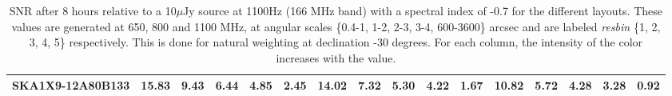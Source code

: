 \begin{table}[htp]
{{\begin{tabular}{|lccccc||ccccc||ccccc|}
SKA1X9-12A80B133 & 15.83 \cellcolor{blue!60.00} & 9.43 \cellcolor{red!22.08} & 6.44 \cellcolor{green!40.31} & 4.85 \cellcolor{orange!18.00} & 2.45 \cellcolor{purple!21.23} & 14.02 \cellcolor{blue!60.00} & 7.32 \cellcolor{red!18.00} & 5.30 \cellcolor{green!24.86} & 4.22 \cellcolor{orange!18.00} & 1.67 \cellcolor{purple!22.20} & 10.82 \cellcolor{blue!54.28} & 5.72 \cellcolor{red!20.05} & 4.28 \cellcolor{green!33.08} & 3.28 \cellcolor{orange!18.00} & 0.92 \cellcolor{purple!18.00}\\ \hline 
\end{tabular}}
\vspace{-0.300000cm}
\hfill
\caption{SNR after 8 hours relative to a 10$\mu$Jy source at 1100Hz (166 MHz band) with a spectral index of -0.7 for the different
layouts. These values are generated at 650, 800 and 1100 MHz, at angular scales \{0.4-1, 1-2, 2-3, 3-4, 600-3600\} arcsec and are
labeled {\it resbin} \{1, 2, 3, 4, 5\} respectively. This is done for natural weighting at declination -30 degrees.
For each column, the intensity of the color increases with the value.}\label{tab:snr10}}
 \end{table}

